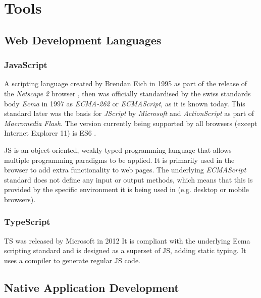 \chapter{Tools}



\section{Web Development Languages}



\subsection{JavaScript}

A scripting language created by Brendan Eich in 1995 as part of the release of the \emph{Netscape 2} browser \parencite{javascriptRelease}, then was officially standardised by the swiss standards body \emph{Ecma} in 1997 as \emph{ECMA-262} or \emph{ECMAScript}, as it is known today. This standard later was the basis for \emph{JScript} by \emph{Microsoft} and \emph{ActionScript} as part of \emph{Macromedia Flash}. The version currently being supported by all browsers (except Internet Explorer 11) is \ac{ES6} \parencite{javascriptHistory}.

\ac{JS} is an object-oriented, weakly-typed programming language that allows multiple programming paradigms to be applied. It is primarily used in the browser to add extra functionality to web pages. The underlying \emph{ECMAScript} standard does not define any input or output methods, which means that this is provided by the specific environment it is being used in (e.g. desktop or mobile browsers).

\subsection{TypeScript}

\ac{TS} was released by Microsoft in 2012  It is compliant with the underlying Ecma scripting standard and is designed as a superset of \ac{JS}, adding static typing. It uses a compiler to generate regular \ac{JS} code.


\section{Native Application Development}

